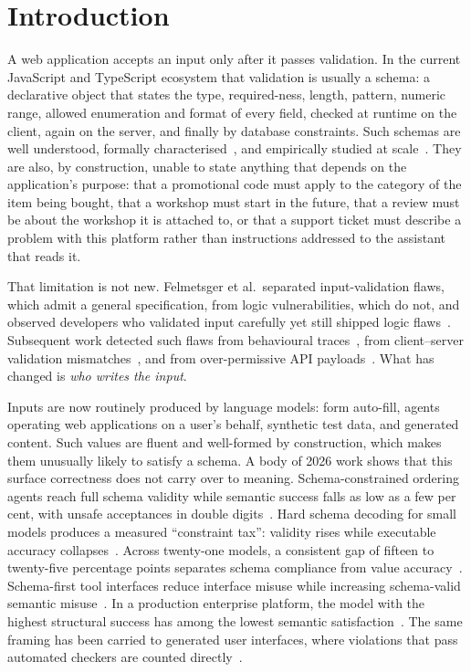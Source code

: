 \documentclass[conference]{IEEEtran}
\begin{document}
\section{Introduction}

A web application accepts an input only after it passes validation. In the current JavaScript and
TypeScript ecosystem that validation is usually a schema: a declarative object that states the type,
required-ness, length, pattern, numeric range, allowed enumeration and format of every field, checked
at runtime on the client, again on the server, and finally by database constraints. Such schemas are
well understood, formally characterised~\cite{pezoa2016foundations,attouche2023jsonschema}, and
empirically studied at scale~\cite{baazizi2021usagenot}. They are also, by construction, unable to
state anything that depends on the application's purpose: that a promotional code must apply to the
category of the item being bought, that a workshop must start in the future, that a review must be
about the workshop it is attached to, or that a support ticket must describe a problem with this
platform rather than instructions addressed to the assistant that reads it.

That limitation is not new. Felmetsger et al.\ separated input-validation flaws, which admit a
general specification, from logic vulnerabilities, which do not, and observed developers who
validated input carefully yet still shipped logic flaws~\cite{felmetsger2010waler}. Subsequent work
detected such flaws from behavioural traces~\cite{pellegrino2014logicflaws}, from client--server
validation mismatches~\cite{bisht2010notamper}, and from over-permissive API
payloads~\cite{corradini2023massassignment}. What has changed is \emph{who writes the input}.

Inputs are now routinely produced by language models: form auto-fill, agents operating web
applications on a user's behalf, synthetic test data, and generated content. Such values are fluent
and well-formed by construction, which makes them unusually likely to satisfy a schema. A body of
2026 work shows that this surface correctness does not carry over to meaning. Schema-constrained
ordering agents reach full schema validity while semantic success falls as low as a few per cent,
with unsafe acceptances in double digits~\cite{li2026orderbench}. Hard schema decoding for small
models produces a measured ``constraint tax'': validity rises while executable accuracy
collapses~\cite{ray2026constrainttax}. Across twenty-one models, a consistent gap of fifteen to
twenty-five percentage points separates schema compliance from value accuracy~\cite{singh2026sob}.
Schema-first tool interfaces reduce interface misuse while increasing schema-valid semantic
misuse~\cite{sigdel2026schemafirst}. In a production enterprise platform, the model with the highest
structural success has among the lowest semantic satisfaction~\cite{wrenn2026enterprise}. The same
framing has been carried to generated user interfaces, where violations that pass automated checkers
are counted directly~\cite{calo2026semanticgap}.
\end{document}
